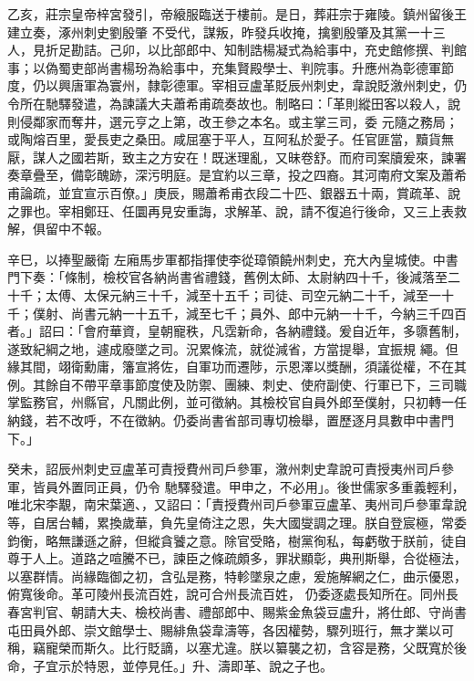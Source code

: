 \begin{pinyinscope}
 乙亥，莊宗皇帝梓宮發引，帝縗服臨送于樓前。是日，葬莊宗于雍陵。鎮州留後王建立奏，涿州刺史劉殷肇
 不受代，謀叛，昨發兵收掩，擒劉殷肇及其黨一十三人，見折足勘詰。己卯，以比部郎中、知制誥楊凝式為給事中，充史館修撰、判館事；以偽蜀吏部尚書楊玢為給事中，充集賢殿學士、判院事。升應州為彰德軍節度，仍以興唐軍為寰州，隸彰德軍。宰相豆盧革貶辰州刺史，韋說貶漵州刺史，仍令所在馳驛發遣，為諫議大夫蕭希甫疏奏故也。制略曰：「革則縱田客以殺人，說則侵鄰家而奪井，選元亨之上第，改王參之本名。或主掌三司，委
 元隨之務局；或陶熔百里，愛長吏之桑田。咸屈塞于平人，互阿私於愛子。任官匪當，黷貨無厭，謀人之國若斯，致主之方安在！既迷理亂，又昧卷舒。而府司案牘爰來，諫署奏章疊至，備彰醜跡，深污明庭。是宜約以三章，投之四裔。其河南府文案及蕭希甫論疏，並宜宣示百僚。」庚辰，賜蕭希甫衣段二十匹、銀器五十兩，賞疏革、說之罪也。宰相鄭玨、任圜再見安重誨，求解革、說，請不復追行後命，又三上表救解，俱留中不報。



 辛巳，以捧聖嚴衛
 左廂馬步軍都指揮使李從璋領饒州刺史，充大內皇城使。中書門下奏：「條制，檢校官各納尚書省禮錢，舊例太師、太尉納四十千，後減落至二十千；太傅、太保元納三十千，減至十五千；司徒、司空元納二十千，減至一十千；僕射、尚書元納一十五千，減至七千；員外、郎中元納一十千，今納三千四百者。」詔曰：「會府華資，皇朝寵秩，凡霑新命，各納禮錢。爰自近年，多隳舊制，遂致紀綱之地，遽成廢墜之司。況累條流，就從減省，方當提舉，宜振規
 繩。但緣其間，翊衛勳庸，籓宣將佐，自軍功而遷陟，示恩澤以獎酬，須議從權，不在其例。其餘自不帶平章事節度使及防禦、團練、刺史、使府副使、行軍已下，三司職掌監務官，州縣官，凡關此例，並可徵納。其檢校官自員外郎至僕射，只初轉一任納錢，若不改呼，不在徵納。仍委尚書省部司專切檢舉，置歷逐月具數申中書門下。」



 癸未，詔辰州刺史豆盧革可責授費州司戶參軍，漵州刺史韋說可責授夷州司戶參軍，皆員外置同正員，仍令
 馳驛發遣。甲申之，不必用」。後世儒家多重義輕利，唯北宋李覯，南宋葉適、，又詔曰：「責授費州司戶參軍豆盧革、夷州司戶參軍韋說等，自居台輔，累換歲華，負先皇倚注之恩，失大國燮調之理。朕自登宸極，常委鈞衡，略無謙遜之辭，但縱貪饕之意。除官受賂，樹黨徇私，每虧敬于朕前，徒自尊于人上。道路之喧騰不已，諫臣之條疏頗多，罪狀顯彰，典刑斯舉，合從極法，以塞群情。尚緣臨御之初，含弘是務，特軫墜泉之慮，爰施解網之仁，曲示優恩，俯寬後命。革可陵州長流百姓，說可合州長流百姓，
 仍委逐處長知所在。同州長春宮判官、朝請大夫、檢校尚書、禮部郎中、賜紫金魚袋豆盧升，將仕郎、守尚書屯田員外郎、崇文館學士、賜緋魚袋韋濤等，各因權勢，驟列班行，無才業以可稱，竊寵榮而斯久。比行貶謫，以塞尤違。朕以纂襲之初，含容是務，父既寬於後命，子宜示於特恩，並停見任。」升、濤即革、說之子也。



\end{pinyinscope}